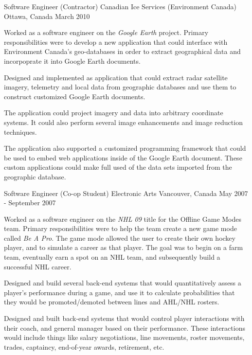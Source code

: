\begin{cventries}

\cventry
{Software Engineer (Contractor)} %
{Canadian Ice Services (Environment Canada)} %
{Ottawa, Canada} %
{March 2010} %
{ %
\begin{cvitems}
  \item {Worked as a software engineer on the \emph{Google Earth} project. Primary responsibilities were to develop a new application that could interface with Environment Canada's geo-databases in order to extract geographical data and incorpoprate it into Google Earth documents.}
  \item {Designed and implemented as application that could extract radar satellite imagery, telemetry and local data from geographic databases and use them to construct customized Google Earth documents.}
  \item {The application could project imagery and data into arbitrary coordinate systems. It could also perform several image enhancements and image reduction techniques.}
  \item {The application also supported a customized programming framework that could be used to embed web applications inside of the Google Earth document. These custom applications could make full used of the data sets imported from the geographic database.}
\end{cvitems}
}


\cventry
{Software Engineer (Co-op Student)} %
{Electronic Arts} %
{Vancouver, Canada} %
{May 2007 - September 2007} %
{ %
\begin{cvitems}
  \item {Worked as a software engineer on the \emph{NHL 09} title for the Offline Game Modes team. Primary responsibilities were to help the team create a new game mode called \emph{Be A Pro}. The game mode allowed the user to create their own hockey player, and to simulate a career as that player. The goal was to begin on a farm team, eventually earn a spot on an NHL team, and subsequently build a successful NHL career.}
  \item {Designed and build several back-end systems that would quantitatively assess a player's performance during a game, and use it to calculate probabilities that they would be promoted/demoted between lines and AHL/NHL rosters.}
  \item {Designed and built back-end systems that would control player interactions with their coach, and general manager based on their performance. These interactions would include things like salary negotiations, line movements, roster movements, trades, captaincy, end-of-year awards, retirement, etc.}
\end{cvitems}
}


\end{cventries}
